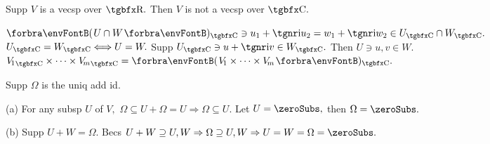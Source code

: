 \BulletPointX{}\;\;Supp $V$ is a vecsp over $\Rbb.$ Then $V$ is not a vecsp over $\Cbb.$\vspace{-4pt}
\SepLine


\BulletPointX{}\par
{} \qquad {}\PfEnd
{}\PfEnd{}
\PfEnd
\BulletPointX{ \quad}$\Par{U\cap W}{_\Cbb}\ni u_1+\i u_2=w_1+\i w_2\in U_\Cbb\cap W_\Cbb.$\PfEnd
\BulletPointX{ \quad}$U_\Cbb=W_\Cbb\Longleftrightarrow U=W.$ \;Supp $U_\Cbb\ni u+\i v\in W_\Cbb.$ Then $U\ni u,v\in W.$\PfEnd
\BulletPointX{ \quad}${V_{\!1}}_\Cbb\times\cdots\times{V_{\!m}}_\Cbb=\Par{V_{\!1}\times\cdots\times V_{\!m}}{_\Cbb}.$\PfEnd
\SepLine

Supp $\Omega$ is the uniq add id.\par\quad
(a) For any subsp $U$ of $V,$ $\Omega\subseteq U+\Omega=U\Rightarrow\Omega\subseteq U$. Let $U=\zeroSubs,$ then $\Omega=\zeroSubs.$\par\quad
(b) Supp $U+W=\Omega.$ Becs $U+W\supseteq U,W\Rightarrow \Omega\supseteq U,W\Rightarrow U=W=\Omega=\zeroSubs.$\PfEnd
\SepLine


